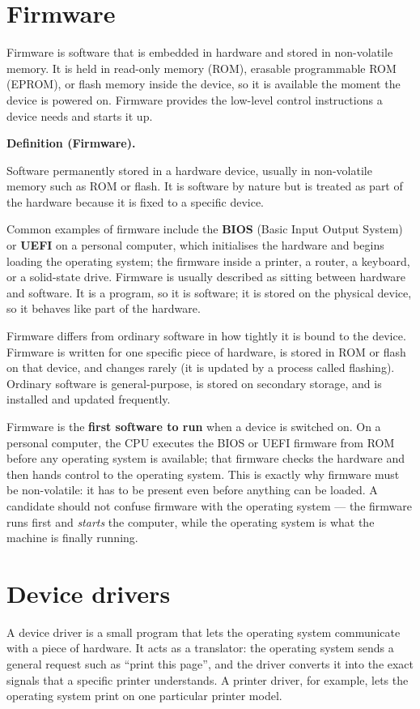 \documentclass[11pt]{article}
\newenvironment{definitionbox}[1]{%
  \par\noindent\textbf{Definition (#1).}\ \itshape
}{\par\vspace{0.3em}}
\begin{document}
\section{Firmware}
Firmware is software that is embedded in hardware and stored in non-volatile
memory. It is held in read-only memory (ROM), erasable programmable ROM
(EPROM), or flash memory inside the device, so it is available the moment the
device is powered on. Firmware provides the low-level control instructions a
device needs and starts it up.

\begin{definitionbox}{Firmware}
Software permanently stored in a hardware device, usually in non-volatile
memory such as ROM or flash. It is software by nature but is treated as part
of the hardware because it is fixed to a specific device.
\end{definitionbox}

Common examples of firmware include the \textbf{BIOS} (Basic Input Output
System) or \textbf{UEFI} on a personal computer, which initialises the
hardware and begins loading the operating system; the firmware inside a
printer, a router, a keyboard, or a solid-state drive. Firmware is usually
described as sitting between hardware and software. It is a program, so it is
software; it is stored on the physical device, so it behaves like part of the
hardware.

Firmware differs from ordinary software in how tightly it is bound to the
device. Firmware is written for one specific piece of hardware, is stored in
ROM or flash on that device, and changes rarely (it is updated by a process
called flashing). Ordinary software is general-purpose, is stored on secondary
storage, and is installed and updated frequently.

Firmware is the \textbf{first software to run} when a device is switched on. On
a personal computer, the CPU executes the BIOS or UEFI firmware from ROM before
any operating system is available; that firmware checks the hardware and then
hands control to the operating system. This is exactly why firmware must be
non-volatile: it has to be present even before anything can be loaded. A
candidate should not confuse firmware with the operating system --- the
firmware runs first and \emph{starts} the computer, while the operating system
is what the machine is finally running.

\section{Device drivers}
A device driver is a small program that lets the operating system communicate
with a piece of hardware. It acts as a translator: the operating system sends
a general request such as ``print this page'', and the driver converts it into
the exact signals that a specific printer understands. A printer driver, for
example, lets the operating system print on one particular printer model.
\end{document}
